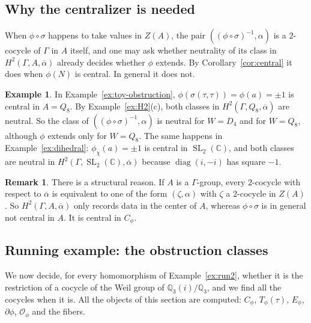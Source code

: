 \documentclass[12pt,letterpaper]{article}
\numberwithin{equation}{section}
\theoremstyle{plain}
\theoremstyle{definition}
\newtheorem{example}[theorem]{Example}
\newtheorem{remark}[theorem]{Remark}
\newcommand{\C}{\mathbb{C}}
\newcommand{\Q}{\mathbb{Q}}
\DeclareMathOperator{\SL}{SL}
\DeclareMathOperator{\diag}{diag}
\begin{document}
\subsection{Why the centralizer is needed}\label{ss:needed}

When $\phi\circ\sigma$ happens to take values in $Z(A)$, the pair
$((\phi\circ\sigma)^{-1},\alpha)$ is a $2$-cocycle of $\Gamma$ in $A$
itself, and one may ask whether neutrality of its class in
$H^2(\Gamma,A,\overline{\alpha})$ already decides whether $\phi$ extends.
By Corollary~\ref{cor:central} it does when $\phi(N)$ is central. In
general it does not.

\begin{example}\label{ex:needed}
In Example~\ref{ex:toy-obstruction}, $\phi(\sigma(\tau,\tau))=\phi(a)=\pm1$
is central in $A=Q_8$. By Example~\ref{ex:H2}(c), both classes in
$H^2(\Gamma,Q_8,\overline{\alpha})$ are neutral. So the class of
$((\phi\circ\sigma)^{-1},\alpha)$ is neutral for $W=D_4$ and for $W=Q_8$,
although $\phi$ extends only for $W=Q_8$. The same happens in
Example~\ref{ex:dihedral}: $\phi_\chi(a)=\pm1$ is central in $\SL_2(\C)$,
and both classes are neutral in $H^2(\Gamma,\SL_2(\C),\overline{\alpha})$
because $\diag(i,-i)$ has square $-1$.
\end{example}

\begin{remark}\label{rem:noglobal}
There is a structural reason. If $A$ is a $\Gamma$-group, every
$2$-cocycle with respect to $\overline{\alpha}$ is equivalent to one of the
form $(\zeta,\alpha)$ with $\zeta$ a $2$-cocycle in $Z(A)$. So
$H^2(\Gamma,A,\overline{\alpha})$ only records data in the center of $A$,
whereas $\phi\circ\sigma$ is in general not central in $A$. It is central
in $C_\phi$.
\end{remark}

\subsection{Running example: the obstruction classes}\label{ss:run3}

We now decide, for every homomorphism of Example~\ref{ex:run2}, whether
it is the restriction of a cocycle of the Weil group of $\Q_3(i)/\Q_3$,
and we find all the cocycles when it is. All the objects of this section
are computed: $C_\phi$, $T_\phi(\tau)$, $E_\phi$, $\partial\phi$,
$\mathcal{O}_\phi$ and the fibers.
\end{document}
